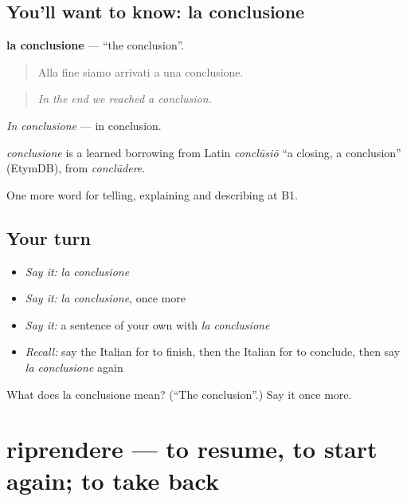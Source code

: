 \subsection*{You'll want to know: la conclusione}
\textbf{la conclusione} — \textquotedblleft{}the conclusion\textquotedblright{}.

\begin{quote}
Alla fine siamo arrivati a una conclusione.
\end{quote}

\begin{quote}
\emph{In the end we reached a conclusion.}
\end{quote}

\emph{In conclusione} — in conclusion.

\begin{cousinweb}
\emph{conclusione} is a learned borrowing from Latin \emph{conclūsiō} \textquotedblleft{}a closing, a conclusion\textquotedblright{} (EtymDB), from \emph{conclūdere}.
\end{cousinweb}

\begin{grammarlens}[title={What you've built}]
One more word for telling, explaining and describing at B1.
\end{grammarlens}

\subsection*{Your turn}
\begin{itemize}
\raggedright
  \item \emph{Say it:} \emph{la conclusione}
  \item \emph{Say it:} \emph{la conclusione}, once more
  \item \emph{Say it:} a sentence of your own with \emph{la conclusione}
  \item \emph{Recall:} say the Italian for to finish, then the Italian for to conclude, then say \emph{la conclusione} again
\end{itemize}

\begin{tcolorbox}[breakable,colback=teal!4,colframe=teal!35!black,title={Before you move on}]
What does la conclusione mean? (\textquotedblleft{}The conclusion\textquotedblright{}.) Say it once more.
\end{tcolorbox}
\section[riprendere]{riprendere — to resume, to start again; to take back}

